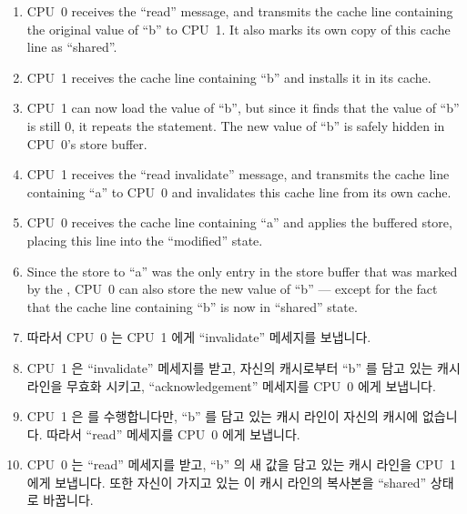 \begin{enumerate}
\item	CPU~0 receives the ``read'' message, and transmits the
	cache line containing the original value of ``b''
	to CPU~1.
	It also marks its own copy of this cache line as ``shared''.
\item	CPU~1 receives the cache line containing ``b'' and installs
	it in its cache.
\item	CPU~1 can now load the value of ``b'',
	but since it finds that the value of ``b'' is still 0, it repeats
	the  statement.
	The new value of ``b'' is safely hidden in CPU~0's store buffer.
\item	CPU~1 receives the ``read invalidate'' message, and
	transmits the cache line containing ``a'' to CPU~0 and
	invalidates this cache line from its own cache.
\item	CPU~0 receives the cache line containing ``a'' and applies
	the buffered store, placing this line into the ``modified''
	state.
\item	Since the store to ``a'' was the only
	entry in the store buffer that was marked by the ,
	CPU~0 can also store the new value of ``b'' --- except for the
	fact that the cache line containing ``b'' is now in ``shared''
	state.
\fi
\item	따라서 CPU~0 는 CPU~1 에게 ``invalidate'' 메세지를 보냅니다.
\item	CPU~1 은 ``invalidate'' 메세지를 받고, 자신의 캐시로부터 ``b'' 를 담고
	있는 캐시 라인을 무효화 시키고, ``acknowledgement'' 메세지를 CPU~0 에게
	보냅니다.
\item	CPU~1 은  를 수행합니다만, ``b'' 를 담고
	있는 캐시 라인이 자신의 캐시에 없습니다.
	따라서 ``read'' 메세지를 CPU~0 에게 보냅니다.
\item	CPU~0 는 ``read'' 메세지를 받고, ``b'' 의 새 값을 담고 있는 캐시 라인을
	CPU~1 에게 보냅니다.
	또한 자신이 가지고 있는 이 캐시 라인의 복사본을 ``shared'' 상태로
	바꿉니다.
\iffalse


\end{enumerate}
